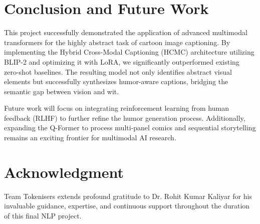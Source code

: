 \documentclass[10pt, conference, compsoc]{IEEEtran}
\begin{document}
\section{Conclusion and Future Work}
This project successfully demonstrated the application of advanced multimodal transformers for the highly abstract task of cartoon image captioning. By implementing the Hybrid Cross-Modal Captioning (HCMC) architecture utilizing BLIP-2 and optimizing it with LoRA, we significantly outperformed existing zero-shot baselines. The resulting model not only identifies abstract visual elements but successfully synthesizes humor-aware captions, bridging the semantic gap between vision and wit.

Future work will focus on integrating reinforcement learning from human feedback (RLHF) to further refine the humor generation process. Additionally, expanding the Q-Former to process multi-panel comics and sequential storytelling remains an exciting frontier for multimodal AI research.

\section*{Acknowledgment}
Team Tokenisers extends profound gratitude to Dr. Rohit Kumar Kaliyar for his invaluable guidance, expertise, and continuous support throughout the duration of this final NLP project. 
\end{document}

